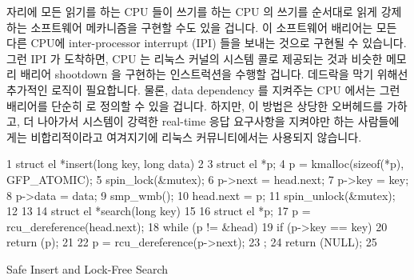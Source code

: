  자리에 모든 읽기를 하는 CPU 들이 쓰기를 하는 CPU 의 쓰기를
순서대로 읽게 강제하는 소프트웨어 메카니즘을 구현할 수도 있을 겁니다.
이 소프트웨어 배리어는 모든 다른 CPU에 inter-processor interrupt (IPI) 들을
보내는 것으로 구현될 수 있습니다.
그런 IPI 가 도착하면, CPU 는 리눅스 커널의  시스템 콜로
제공되는 것과 비슷한 메모리 배리어 shootdown 을 구현하는 인스트럭션을 수행할
겁니다.
데드락을 막기 위해선 추가적인 로직이 필요합니다.
물론, data dependency 를 지켜주는 CPU 에서는 그런 배리어를 단순히
 로 정의할 수 있을 겁니다.
하지만, 이 방법은 상당한 오버헤드를 가하고, 더 나아가서 시스템이 강력한
real-time 응답 요구사항을 지켜야만 하는 사람들에게는 비합리적이라고 여겨지기에
리눅스 커뮤니티에서는 사용되지 않습니다.

\begin{listing}[tbp]
{ \scriptsize
\begin{verbbox}
 1  struct el *insert(long key, long data)
 2  {
 3      struct el *p;
 4      p = kmalloc(sizeof(*p), GFP_ATOMIC);
 5      spin_lock(&mutex);
 6      p->next = head.next;
 7      p->key = key;
 8      p->data = data;
 9      smp_wmb();
10      head.next = p;
11      spin_unlock(&mutex);
12  }
13
14  struct el *search(long key)
15  {
16      struct el *p;
17      p = rcu_dereference(head.next);
18      while (p != &head) {
19          if (p->key == key) {
20              return (p);
21          }
22          p = rcu_dereference(p->next);
23      };
24      return (NULL);
25  }
\end{verbbox}
}
\centering
\theverbbox
\caption{Safe Insert and Lock-Free Search}
\label{lst:memorder:Safe Insert and Lock-Free Search}
\end{listing}

